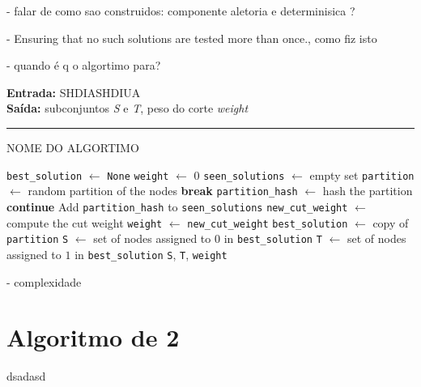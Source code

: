 \documentclass[mirror, portugues]{revdetua}
\begin{document}
- falar de como sao construidos: componente aletoria e determinisica ?

- Ensuring that no such solutions are tested more than once., como fiz isto

- quando é q o algortimo para?






\begin{algorithm}[H]
\raggedright
\textbf{Entrada:} SHDIASHDIUA \\
\textbf{Saída:} subconjuntos \textit{S} e \textit{T}, peso do corte \textit{weight} \\
\hrule 
\caption{NOME DO ALGORTIMO}
\begin{algorithmic}[1]
    \State \texttt{best\_solution} $\gets$ \texttt{None}
    \State \texttt{weight} $\gets$ 0
    \State \texttt{seen\_solutions} $\gets$ empty set
        \State \texttt{partition} $\gets$ random partition of the nodes
            \State \textbf{break}
        \EndIf
        \State \texttt{partition\_hash} $\gets$ hash the partition
            \State \textbf{continue}
        \EndIf
        \State Add \texttt{partition\_hash} to \texttt{seen\_solutions}
        \State \texttt{new\_cut\_weight} $\gets$ compute the cut weight
            \State \texttt{weight} $\gets$ \texttt{new\_cut\_weight}
            \State \texttt{best\_solution} $\gets$ copy of \texttt{partition}
        \EndIf
    \EndFor
    \State \texttt{S} $\gets$ set of nodes assigned to $0$ in \texttt{best\_solution}
    \State \texttt{T} $\gets$ set of nodes assigned to $1$ in \texttt{best\_solution}
    \Return \texttt{S}, \texttt{T}, \texttt{weight}
\end{algorithmic}
\end{algorithm}
    


- complexidade

\section{Algoritmo de 2}

dsadasd
\end{document}
